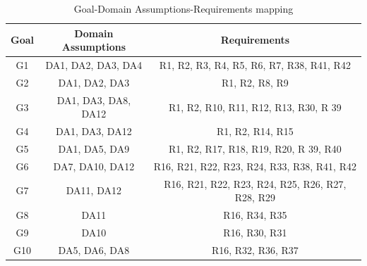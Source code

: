\documentclass[12pt]{report}
\begin{document}
    \begin{table}[h]
    \centering
    \begin{tabular}{|c|c|c|}
        \hline
         Goal  & Domain Assumptions & Requirements\\
        \hline
        G1 & DA1, DA2, DA3, DA4 & R1, R2, R3, R4, R5, R6, R7, R38, R41, R42\\
        \hline
        G2 & DA1, DA2, DA3 & R1, R2, R8, R9\\
        \hline
        G3 & DA1, DA3, DA8, DA12 & R1, R2, R10, R11, R12, R13, R30, R 39\\
        \hline
        G4 & DA1, DA3, DA12 & R1, R2, R14, R15\\
        \hline
        G5 & DA1, DA5, DA9 & R1, R2, R17, R18, R19, R20, R 39, R40\\
        \hline
        G6 & DA7, DA10, DA12 & R16, R21, R22, R23, R24, R33, R38, R41, R42\\
        \hline
        G7 & DA11, DA12 & R16, R21, R22, R23, R24, R25, R26, R27, R28, R29\\
        \hline
        G8 & DA11 & R16, R34, R35\\
        \hline
        G9 &  DA10 & R16, R30, R31\\
        \hline
        G10 & DA5, DA6, DA8 & R16, R32, R36, R37\\
        \hline
    \end{tabular}
    \caption{Goal-Domain Assumptions-Requirements mapping}
    \end{table}
\end{document}
